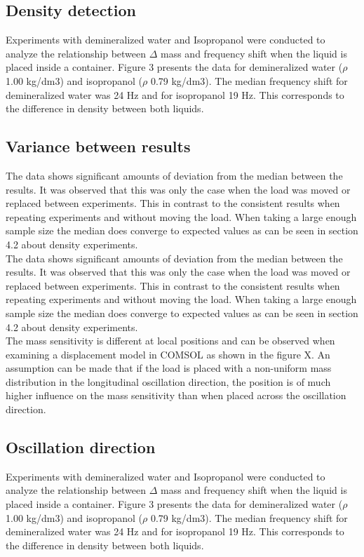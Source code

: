\documentclass[a4paper, 10pt, conference]{ieeeconf}      %
\begin{document}
\subsection{Density detection}
    Experiments with demineralized water and Isopropanol were conducted to analyze the relationship between $\Delta$ mass and frequency shift when the liquid is placed inside a container.
    Figure 3 presents the data for demineralized water ($\rho$ 1.00 kg/dm3) and isopropanol ($\rho$ 0.79 kg/dm3).
    The median frequency shift for demineralized water was 24 Hz and for isopropanol 19 Hz.
    This corresponds to the difference in density between both liquids. \\
    
    
\subsection{Variance between results}
    The data shows significant amounts of deviation from the median between the results.
    It was observed that this was only the case when the load was moved or replaced between experiments.
    This in contrast to the consistent results when repeating experiments and without moving the load.
    When taking a large enough sample size the median does converge to expected values as can be seen in section 4.2 about density experiments. \\

    The data shows significant amounts of deviation from the median between the results.
    It was observed that this was only the case when the load was moved or replaced between experiments.
    This in contrast to the consistent results when repeating experiments and without moving the load.
    When taking a large enough sample size the median does converge to expected values as can be seen in section 4.2 about density experiments. \\
    
    The mass sensitivity is different at local positions and can be observed when examining a displacement model in COMSOL as shown in the figure X.
    An assumption can be made that if the load is placed with a non-uniform mass distribution in the longitudinal oscillation direction, the position is of much higher influence on the mass sensitivity than when placed across the oscillation direction. \\


\subsection{Oscillation direction}
    Experiments with demineralized water and Isopropanol were conducted to analyze the relationship between $\Delta$ mass and frequency shift when the liquid is placed inside a container.
    Figure 3 presents the data for demineralized water ($\rho$ 1.00 kg/dm3) and isopropanol ($\rho$ 0.79 kg/dm3).
    The median frequency shift for demineralized water was 24 Hz and for isopropanol 19 Hz.
    This corresponds to the difference in density between both liquids. \\
    
\end{document}
